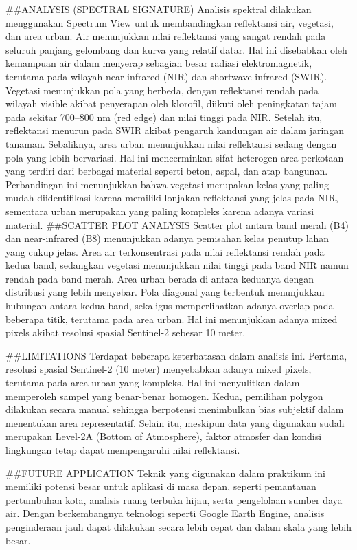 \documentclass[
  letterpaper,
  DIV=11,
  numbers=noendperiod]{scrreprt}
\begin{document}
\#\#ANALYSIS (SPECTRAL SIGNATURE) Analisis spektral dilakukan
menggunakan Spectrum View untuk membandingkan reflektansi air, vegetasi,
dan area urban. Air menunjukkan nilai reflektansi yang sangat rendah
pada seluruh panjang gelombang dan kurva yang relatif datar. Hal ini
disebabkan oleh kemampuan air dalam menyerap sebagian besar radiasi
elektromagnetik, terutama pada wilayah near-infrared (NIR) dan shortwave
infrared (SWIR). Vegetasi menunjukkan pola yang berbeda, dengan
reflektansi rendah pada wilayah visible akibat penyerapan oleh klorofil,
diikuti oleh peningkatan tajam pada sekitar 700--800 nm (red edge) dan
nilai tinggi pada NIR. Setelah itu, reflektansi menurun pada SWIR akibat
pengaruh kandungan air dalam jaringan tanaman. Sebaliknya, area urban
menunjukkan nilai reflektansi sedang dengan pola yang lebih bervariasi.
Hal ini mencerminkan sifat heterogen area perkotaan yang terdiri dari
berbagai material seperti beton, aspal, dan atap bangunan. Perbandingan
ini menunjukkan bahwa vegetasi merupakan kelas yang paling mudah
diidentifikasi karena memiliki lonjakan reflektansi yang jelas pada NIR,
sementara urban merupakan yang paling kompleks karena adanya variasi
material. \#\#SCATTER PLOT ANALYSIS Scatter plot antara band merah (B4)
dan near-infrared (B8) menunjukkan adanya pemisahan kelas penutup lahan
yang cukup jelas. Area air terkonsentrasi pada nilai reflektansi rendah
pada kedua band, sedangkan vegetasi menunjukkan nilai tinggi pada band
NIR namun rendah pada band merah. Area urban berada di antara keduanya
dengan distribusi yang lebih menyebar. Pola diagonal yang terbentuk
menunjukkan hubungan antara kedua band, sekaligus memperlihatkan adanya
overlap pada beberapa titik, terutama pada area urban. Hal ini
menunjukkan adanya mixed pixels akibat resolusi spasial Sentinel-2
sebesar 10 meter.

\#\#LIMITATIONS Terdapat beberapa keterbatasan dalam analisis ini.
Pertama, resolusi spasial Sentinel-2 (10 meter) menyebabkan adanya mixed
pixels, terutama pada area urban yang kompleks. Hal ini menyulitkan
dalam memperoleh sampel yang benar-benar homogen. Kedua, pemilihan
polygon dilakukan secara manual sehingga berpotensi menimbulkan bias
subjektif dalam menentukan area representatif. Selain itu, meskipun data
yang digunakan sudah merupakan Level-2A (Bottom of Atmosphere), faktor
atmosfer dan kondisi lingkungan tetap dapat mempengaruhi nilai
reflektansi.

\#\#FUTURE APPLICATION Teknik yang digunakan dalam praktikum ini
memiliki potensi besar untuk aplikasi di masa depan, seperti pemantauan
pertumbuhan kota, analisis ruang terbuka hijau, serta pengelolaan sumber
daya air. Dengan berkembangnya teknologi seperti Google Earth Engine,
analisis penginderaan jauh dapat dilakukan secara lebih cepat dan dalam
skala yang lebih besar.
\end{document}

